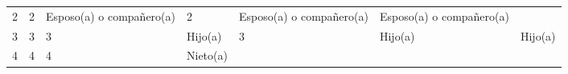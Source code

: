 \documentclass[
]{book}
\begin{document}
\begin{longtable}[]{@{}lllllll@{}}
\begin{minipage}[t]{0.07\columnwidth}
2\strut
\end{minipage} & \begin{minipage}[t]{0.07\columnwidth}\raggedright
2\strut
\end{minipage} & \begin{minipage}[t]{0.16\columnwidth}\raggedright
Esposo(a) o compañero(a)\strut
\end{minipage} & \begin{minipage}[t]{0.09\columnwidth}\raggedright
2\strut
\end{minipage} & \begin{minipage}[t]{0.16\columnwidth}\raggedright
Esposo(a) o compañero(a)\strut
\end{minipage} & \begin{minipage}[t]{0.16\columnwidth}\raggedright
Esposo(a) o compañero(a)\strut
\end{minipage}\tabularnewline
\begin{minipage}[t]{0.10\columnwidth}\raggedright
3\strut
\end{minipage} & \begin{minipage}[t]{0.07\columnwidth}\raggedright
3\strut
\end{minipage} & \begin{minipage}[t]{0.07\columnwidth}\raggedright
3\strut
\end{minipage} & \begin{minipage}[t]{0.16\columnwidth}\raggedright
Hijo(a)\strut
\end{minipage} & \begin{minipage}[t]{0.09\columnwidth}\raggedright
3\strut
\end{minipage} & \begin{minipage}[t]{0.16\columnwidth}\raggedright
Hijo(a)\strut
\end{minipage} & \begin{minipage}[t]{0.16\columnwidth}\raggedright
Hijo(a)\strut
\end{minipage}\tabularnewline
\begin{minipage}[t]{0.10\columnwidth}\raggedright
4\strut
\end{minipage} & \begin{minipage}[t]{0.07\columnwidth}\raggedright
4\strut
\end{minipage} & \begin{minipage}[t]{0.07\columnwidth}\raggedright
4\strut
\end{minipage} & \begin{minipage}[t]{0.16\columnwidth}\raggedright
Nieto(a)\strut

\end{minipage}
\end{longtable}
\end{document}
